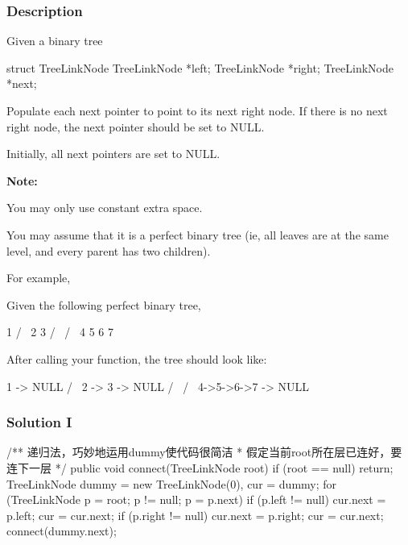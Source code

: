 \subsubsection{Description}

Given a binary tree
\begin{Code}
    struct TreeLinkNode {
      TreeLinkNode *left;
      TreeLinkNode *right;
      TreeLinkNode *next;
    }
\end{Code}

Populate each next pointer to point to its next right node. If there is no next right node, the next pointer should be set to NULL.

Initially, all next pointers are set to NULL.

\textbf{Note:}

You may only use constant extra space.

You may assume that it is a perfect binary tree (ie, all leaves are at the same level, and every parent has two children).

For example,

Given the following perfect binary tree,
\begin{Code}
         1
       /  \
      2    3
     / \  / \
    4  5  6  7
\end{Code}

After calling your function, the tree should look like:
\begin{Code}
         1 -> NULL
       /  \
      2 -> 3 -> NULL
     / \  / \
    4->5->6->7 -> NULL
\end{Code}

\newpage

\subsubsection{Solution I}

\begin{Code}
/** 递归法，巧妙地运用dummy使代码很简洁
 *  假定当前root所在层已连好，要连下一层
 */
public void connect(TreeLinkNode root) {
    if (root == null) {
        return;
    }
    TreeLinkNode dummy = new TreeLinkNode(0), cur = dummy;
    for (TreeLinkNode p = root; p != null; p = p.next) {
        if (p.left != null) {
            cur.next = p.left;
            cur = cur.next;
        }
        if (p.right != null) {
            cur.next = p.right;
            cur = cur.next;
        }
    }
    connect(dummy.next);
}

\end{Code}

